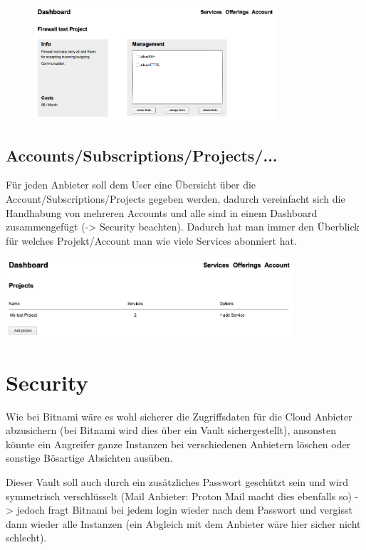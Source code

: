 \begin{figure}[h]
  \includegraphics[width=0.8\textwidth]{./03_Analyse/03_Dashboard/images/service_info_network}
\end{figure}



\subsection{Accounts/Subscriptions/Projects/...}
Für jeden Anbieter soll dem User eine Übersicht über die 
Account/Subscriptions/Projects gegeben werden, dadurch vereinfacht sich die 
Handhabung von mehreren Accounts und alle sind in einem Dashboard zusammengefügt 
(-> Security beachten).
Dadurch hat man immer den Überblick für welches Projekt/Account man wie viele 
Services abonniert hat.


\includegraphics[width=0.8\textwidth]{./03_Analyse/03_Dashboard/images/account_projects.png}


\section{Security}
Wie bei Bitnami wäre es wohl sicherer die Zugriffsdaten für die Cloud Anbieter 
abzusichern (bei Bitnami wird dies über ein Vault sichergestellt), ansonsten 
könnte ein Angreifer ganze Instanzen bei verschiedenen Anbietern löschen oder 
sonstige Bösartige Absichten ausüben.

Dieser Vault soll auch durch ein zusätzliches Passwort geschützt sein und 
wird symmetrisch verschlüsselt (Mail Anbieter: Proton Mail macht dies ebenfalls 
so) -> jedoch fragt Bitnami bei jedem login wieder nach dem Passwort und 
vergisst dann wieder alle Instanzen (ein Abgleich mit dem Anbieter wäre hier sicher nicht 
schlecht).

